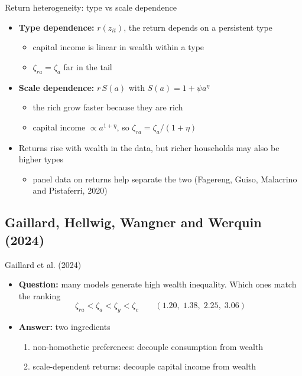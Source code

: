 \documentclass[10pt,english,10pt,handout]{beamer}
\begin{document}
\begin{frame}{Return heterogeneity: type vs scale dependence}
\begin{itemize}
\item \textbf{Type dependence:} $r(z_{it})$, the return depends on a persistent type
\begin{itemize}
\item capital income is linear in wealth within a type
\item $\zeta_{ra}=\zeta_{a}$ far in the tail
\end{itemize}
\item \textbf{Scale dependence:} $r\,S(a)$ with $S(a)=1+\psi a^{\eta}$
\begin{itemize}
\item the rich grow faster because they are rich
\item capital income $\propto a^{1+\eta}$, so $\zeta_{ra}=\zeta_{a}/(1+\eta)$
\end{itemize}
\item Returns rise with wealth in the data, but richer households may also be higher types
\begin{itemize}
\item panel data on returns help separate the two (Fagereng, Guiso, Malacrino and Pistaferri, 2020)
\end{itemize}
\end{itemize}
\end{frame}

\subsection{Gaillard, Hellwig, Wangner and Werquin (2024)}

\begin{frame}{Gaillard et al. (2024)}
\begin{itemize}
\item \textbf{Question:} many models generate high wealth inequality. Which ones match the ranking
\[
\zeta_{ra}<\zeta_{a}<\zeta_{y}<\zeta_{c}\qquad(1.20,\;1.38,\;2.25,\;3.06)
\]
\item \textbf{Answer:} two ingredients
\begin{enumerate}
\item non-homothetic preferences: decouple consumption from wealth
\item scale-dependent returns: decouple capital income from wealth
\end{enumerate}
\end{itemize}
\end{frame}
\end{document}

